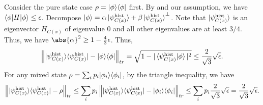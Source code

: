 \begin{prf} Consider the pure state case $\rho=|\phi\rangle\langle \phi|$ first. By  and our assumption, we have $\braket{\phi|H|\phi} \leq \epsilon$.
Decompose $\ket{\phi}= \alpha \ket{\psi_{C(x)}^{\mathrm{hist}}} + \beta \ket{\psi_{C(x)}^{\mathrm{hist}}}^\bot$. Note that $\ket{\psi_{C(x)}^{\mathrm{hist}}}$ is an eigenvector $H_{C(x)}$ of eigenvalue 0 and all other eigenvalues are at least $3/4$. Thus, we have $\abs{\alpha}^2 \geq 1-\frac{4}{3}\epsilon$. Thus,
\[
   \left\lVert|\psi^{\mathrm{hist}}_{C(x)}\rangle\langle \psi^{\mathrm{hist}}_{C(x)}|- |\phi\rangle\langle \phi|\right\rVert_{tr} = \sqrt{1- |\braket{\psi^{\mathrm{hist}}_{C(x)}|\phi}|^2}
   \leq \frac{2}{\sqrt{3}}\sqrt{\epsilon}.
\]
For any mixed state $\rho=\sum_i p_i |\phi_i\rangle\langle \phi_i|$, by the triangle inequality, we have
\[
    \left\lVert|\psi^{\mathrm{hist}}_{C(x)}\rangle\langle \psi^{\mathrm{hist}}_{C(x)}|- \rho\right\rVert_{tr} \leq \sum_i p_i    \left\lVert|\psi^{\mathrm{hist}}_{C(x)}\rangle\langle \psi^{\mathrm{hist}}_{C(x)}|- |\phi_i\rangle\langle \phi_i|\right\rVert_{tr} \leq \sum_i p_i \frac{2}{\sqrt{3}} \sqrt{\epsilon} =\frac{2}{\sqrt{3}}\sqrt{\epsilon}.
\]
\end{prf}

